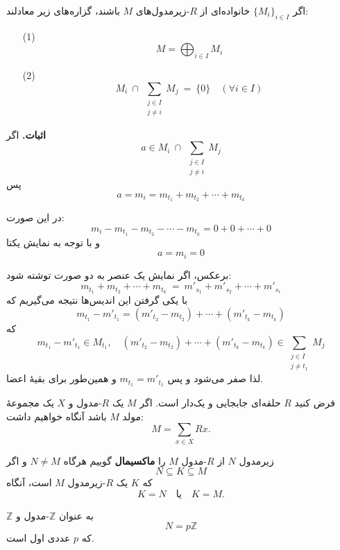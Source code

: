 \begin{frame}
    \begin{corollary}
        اگر $\{M_i\}_{i \in I}$ خانواده‌ای از $R$-زیرمدول‌های $M$ باشند، گزاره‌های زیر معادلند:
        \begin{enumerate}
            \item[(1)]
                  \[
                      M = \bigoplus_{i \in I} M_i
                  \]
            \item[(2)]
                  \[
                      M_i \ \cap \ \sum_{\substack{j \in I \\ j \neq i}} M_j \ = \ \{0\} \quad (\forall i \in I)
                  \]
        \end{enumerate}
    \end{corollary}

    \textbf{اثبات.}
    اگر
    \[
        a \in M_i \ \cap \ \sum_{\substack{j \in I \\ j \neq i}} M_j
    \]
    پس
    \[
        a = m_i = m_{t_1} + m_{t_2} + \cdots + m_{t_k}
    \]
\end{frame}

\begin{frame}

    در این صورت:
    \[
        m_i - m_{t_1} - m_{t_2} - \cdots - m_{t_k} = 0 + 0 + \cdots + 0
    \]
    و با توجه به نمایش یکتا
    $$a = m_i = 0$$

    برعکس، اگر نمایش یک عنصر به‌ دو صورت توشته شود:
    \[
        m_{t_1} + m_{t_2} + \cdots + m_{t_k} \ = \ m'_{s_1} + m'_{s_2} + \cdots + m'_{s_r}
    \]
    با یکی گرفتن این اندیس‌ها نتیجه می‌گیریم که
    \[
        m_{t_1} - m'_{t_1}
        = (m'_{t_2} - m_{t_2}) + \cdots + (m'_{t_k} - m_{t_k})
    \]
    که
    \[
        m_{t_1} - m'_{t_1} \in M_{t_1},
        \quad
        (m'_{t_2} - m_{t_2}) + \cdots + (m'_{t_k} - m_{t_k})
        \in \sum_{\substack{j \in I \\ j \neq t_1}} M_j
    \]
    لذا صفر می‌شود و پس $m_{t_1} = m'_{t_1}$ و همین‌طور برای بقیهٔ اعضا.

\end{frame}

\begin{frame}
    \begin{remark}
        فرض کنید
        \(R\)
        حلقه‌ای جابجایی و یک‌دار است.
        اگر $M$ یک $R$-مدول و $X$ یک مجموعهٔ مولد $M$ باشد آنگاه خواهیم داشت:
        \[
            M = \sum_{x \in X} Rx.
        \]

    \end{remark}


    \begin{definition}
        زیرمدول $N$ از $R$-مدول $M$ را \textbf{ماکسیمال} گوییم هرگاه $N \neq M$ و اگر
        \[
            N \subseteq K \subseteq M
        \]
        که $K$ یک $R$-زیرمدول $M$ است، آنگاه
        \[
            K = N \quad \text{یا} \quad K = M.
        \]

    \end{definition}



\end{frame}

\begin{frame}
    \begin{example}
        $\mathbb{Z}$ به عنوان $\mathbb{Z}$-مدول و
        \[
            N = p\mathbb{Z}
        \]
        که $p$ عددی اول است.

    \end{example}
\end{frame}